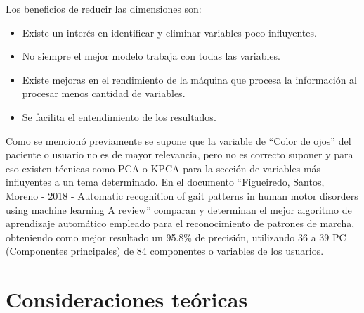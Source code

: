 Los beneficios de reducir las dimensiones son:
\begin{center}
\begin{itemize}
\item Existe un interés en identificar y eliminar variables poco influyentes.
\item No siempre el mejor modelo trabaja con todas las variables.
\item Existe mejoras en el rendimiento de la máquina que procesa la información al procesar menos cantidad de variables.
\item Se facilita el entendimiento de los resultados.
\end{itemize}
\end{center}
Como se mencionó previamente se supone que la variable de “Color de ojos” del paciente o usuario no es de mayor relevancia, pero no es correcto suponer y para eso existen técnicas como PCA o KPCA para la sección de variables más influyentes a un tema determinado.
En el documento “Figueiredo, Santos, Moreno - 2018 - Automatic recognition of gait patterns in human motor disorders using machine learning A review” comparan y determinan el mejor algoritmo de aprendizaje automático empleado para el reconocimiento de patrones de marcha, obteniendo como mejor resultado un 95.8\% de precisión, utilizando 36 a 39 PC (Componentes principales) de 84 componentes o variables de los usuarios.


\section{Consideraciones teóricas}

